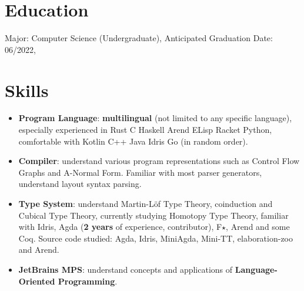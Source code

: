 \documentclass{resume}
\begin{document}
\section{Education}
Major: Computer Science (Undergraduate), Anticipated Graduation Date: 06/2022, 
\section{Skills}
\begin{itemize}[parsep=0.25ex]
\item
\textbf{Program Language}:
\textbf{multilingual} (not limited to any specific language),
especially experienced in Rust C Haskell Arend ELisp Racket Python,
comfortable with Kotlin C++ Java Idris Go (in random order).
\item
\textbf{Compiler}:
understand various program representations such as
Control Flow Graphs and A-Normal Form.
Familiar with most parser generators, understand layout syntax parsing.
\item
\textbf{Type System}:
understand Martin-L\"{o}f Type Theory, coinduction and Cubical Type Theory,
currently studying Homotopy Type Theory,
familiar with Idris, Agda (\textbf{2 years} of experience, contributor),
F$\star$, Arend and some Coq.
\subitem Source code studied: Agda, Idris, MiniAgda, Mini-TT, elaboration-zoo and Arend.
\item \textbf{JetBrains MPS}:
understand concepts and applications of \textbf{Language-Oriented Programming}.
\end{itemize}
\end{document}
